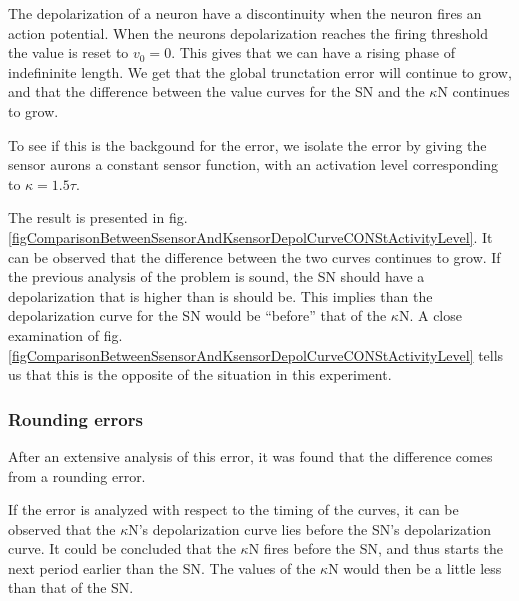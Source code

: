 The depolarization of a neuron have a discontinuity when the neuron fires an action potential. 
When the neurons depolarization reaches the firing threshold the value is reset to $v_0 = 0$.
This gives that we can have a rising phase of indefininite length.
We get that the global trunctation error will continue to grow, and that the difference between the value curves for the SN and the $\kappa$N continues to grow.

To see if this is the backgound for the error, we isolate the error by giving the sensor aurons a constant sensor function, with an activation level corresponding to $\kappa = 1.5 \tau$.

The result is presented in fig. \ref{figComparisonBetweenSsensorAndKsensorDepolCurveCONStActivityLevel}. %
It can be observed that the difference between the two curves continues to grow.
If the previous analysis of the problem is sound, the SN should have a depolarization that is higher than is should be.
This implies than the depolarization curve for the SN would be ``before'' that of the $\kappa$N.
A close examination of fig. \ref{figComparisonBetweenSsensorAndKsensorDepolCurveCONStActivityLevel} tells us that this is the opposite of the situation in this experiment.



	\subsubsection{Rounding errors}
After an extensive analysis of this error, it was found that the difference comes from a rounding error.

If the error is analyzed with respect to the timing of the curves, it can be observed that the $\kappa$N's depolarization curve lies before the SN's depolarization curve.
It could be concluded that the $\kappa$N fires before the SN, and thus starts the next period earlier than the SN.
The values of the $\kappa$N would then be a little less than that of the SN.


